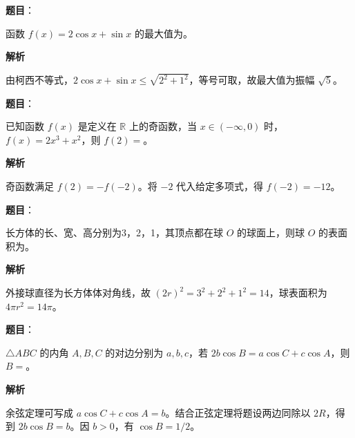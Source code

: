\begin{answer}

\textbf{题目}：

函数 \(f(x)=2\cos x+\sin x\) 的最大值为\gkblank{}。

\textbf{解析}

由柯西不等式，\(2\cos x+\sin x\leq\sqrt{2^2+1^2}\)，等号可取，故最大值为振幅 \(\sqrt5\)。


\end{answer}
\begin{answer}

\textbf{题目}：

已知函数 \(f(x)\) 是定义在 \(\mathbb R\) 上的奇函数，当 \(x\in(-\infty,0)\) 时，\(f(x)=2x^3+x^2\)，则 \(f(2)=\)\gkblank{}。

\textbf{解析}

奇函数满足 \(f(2)=-f(-2)\)。将 \(-2\) 代入给定多项式，得 \(f(-2)=-12\)。


\end{answer}
\begin{answer}

\textbf{题目}：

长方体的长、宽、高分别为3，2，1，其顶点都在球 \(O\) 的球面上，则球 \(O\) 的表面积为\gkblank{}。

\textbf{解析}

外接球直径为长方体体对角线，故 \((2r)^2=3^2+2^2+1^2=14\)，球表面积为 \(4\pi r^2=14\pi\)。


\end{answer}
\begin{answer}

\textbf{题目}：

\(\triangle ABC\) 的内角 \(A,B,C\) 的对边分别为 \(a,b,c\)，若 \(2b\cos B=a\cos C+c\cos A\)，则 \(B=\)\gkblank{}。

\textbf{解析}

余弦定理可写成 \(a\cos C+c\cos A=b\)。结合正弦定理将题设两边同除以 \(2R\)，得到 \(2b\cos B=b\)。因 \(b>0\)，有 \(\cos B=1/2\)。


\end{answer}
